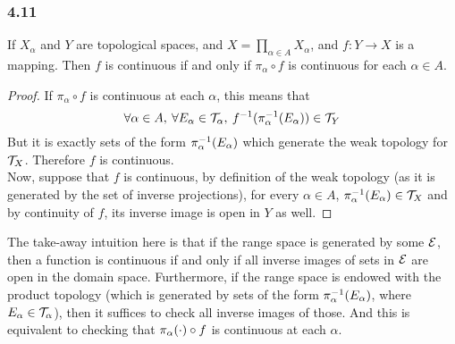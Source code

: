 \documentclass[../../main.tex]{subfiles}
\begin{document}
\subsubsection*{4.11}
\begin{wts}
    If $X_\alpha$ and $Y$ are topological spaces, and $X = \prod_{\alpha\in A}X_\alpha$, and $f:Y\to X$ is a mapping. Then $f$ is continuous if and only if $\pi_\alpha\circ f$ is continuous for each $\alpha\in A$.
\end{wts}
\begin{proof}
    If $\pi_\alpha\circ f$ is continuous at each $\alpha$, this means that
    \[
    \forall \alpha\in A, \:\forall E_\alpha\in\mathcal{T}_\alpha,\: f^{-1}(\pi_{\alpha}^{-1}({E_\alpha}))\in \mathcal{T}_Y
    \]
    But it is exactly sets of the form $\pi_{\alpha}^{-1}({E_\alpha})$ which generate the weak topology for $\mathcal{T}_X$. Therefore $f$ is continuous.\\
    
    Now, suppose that $f$ is continuous, by definition of the weak topology (as it is generated by the set of inverse projections), for every $\alpha\in A$, $\pi_{\alpha}^{-1}({E_\alpha})\in \mathcal{T}_X$ and by continuity of $f$, its inverse image is open in $Y$ as well.
\end{proof}
\remark The take-away intuition here is that if the range space is generated by some $\mathcal{E}$, then a function is continuous if and only if all inverse images of sets in $\mathcal{E}$ are open in the domain space. Furthermore, if the range space is endowed with the product topology (which is generated by sets of the form $\pi_{\alpha}^{-1}({E_\alpha})$, where $E_\alpha\in \mathcal{T}_\alpha$), then it suffices to check all inverse images of those. And this is equivalent to checking that $\pi_{\alpha}({\cdot})\circ f$ is continuous at each $\alpha$.
\end{document}
